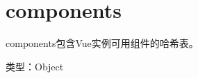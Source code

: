 \begin{lstlisting}[language=JavaScript]

\end{lstlisting}




\begin{lstlisting}[language=JavaScript]

\end{lstlisting}




\begin{lstlisting}[language=JavaScript]

\end{lstlisting}






\section{components}



components包含Vue实例可用组件的哈希表。


\begin{compactitem}
\item 类型：Object
\end{compactitem}





\begin{lstlisting}[language=JavaScript]

\end{lstlisting}




\begin{lstlisting}[language=JavaScript]

\end{lstlisting}




\begin{lstlisting}[language=JavaScript]

\end{lstlisting}




\begin{lstlisting}[language=JavaScript]

\end{lstlisting}




\begin{lstlisting}[language=JavaScript]

\end{lstlisting}




